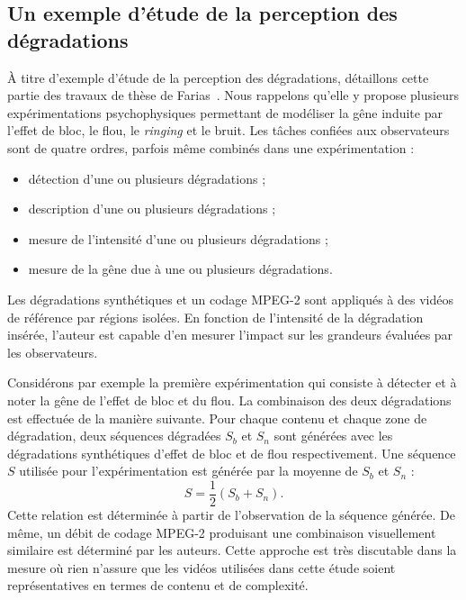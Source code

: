 \subsection{Un exemple d'étude de la perception des dégradations}
À titre d'exemple d'étude de la perception des dégradations, détaillons cette partie des travaux de thèse de Farias~\cite{farias-phd}. Nous rappelons qu'elle y propose plusieurs expérimentations psychophysiques permettant de modéliser la gêne induite par l'effet de bloc, le flou, le \emph{ringing} et le bruit. Les tâches confiées aux observateurs sont de quatre ordres, parfois même combinés dans une expérimentation :
\begin{itemize}
\item détection d'une ou plusieurs dégradations ;
\item description d'une ou plusieurs dégradations ;
\item mesure de l'intensité d'une ou plusieurs dégradations ;
\item mesure de la gêne due à une ou plusieurs dégradations.
\end{itemize}
%
Les dégradations synthétiques et un codage MPEG-2 sont appliqués à des vidéos de référence par régions isolées. En fonction de l'intensité de la dégradation insérée, l'auteur est capable d'en mesurer l'impact sur les grandeurs évaluées par les observateurs.

Considérons par exemple la première expérimentation qui consiste à détecter et à noter la gêne de l'effet de bloc et du flou. La combinaison des deux dégradations est effectuée de la manière suivante. Pour chaque contenu et chaque zone de dégradation, deux séquences dégradées $S_b$ et $S_n$ sont générées avec les dégradations synthétiques d'effet de bloc et de flou respectivement. Une séquence $S$ utilisée pour l'expérimentation est générée par la moyenne de $S_b$ et $S_n$ :
\begin{equation}
S = \frac{1}{2} \left(S_b + S_n\right).
\end{equation}
%
Cette relation est déterminée à partir de l'observation de la séquence générée. De même, un débit de codage MPEG-2 produisant une combinaison visuellement similaire est déterminé par les auteurs. Cette approche est très discutable dans la mesure où rien n'assure que les vidéos utilisées dans cette étude soient représentatives en termes de contenu et de complexité.

